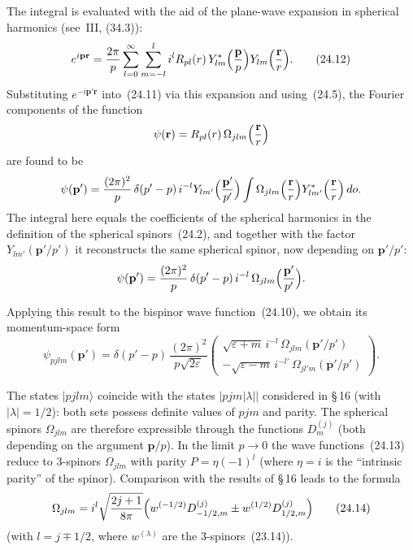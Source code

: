 The integral is evaluated with the aid of the plane-wave expansion in spherical harmonics (see~III, (34.3)):
\begin{equation}
e^{i\mathbf{p}\mathbf{r}} = \frac{2\pi}{p}\sum_{l=0}^{\infty}\sum_{m=-l}^{l}i^l R_{pl}(r)\,Y^*_{lm}\Bigl(\frac{\mathbf{p}}{p}\Bigr)Y_{lm}\Bigl(\frac{\mathbf{r}}{r}\Bigr).
\tag{24.12}
\end{equation}
Substituting $e^{-i\mathbf{p}'\mathbf{r}}$ into~(24.11) via this expansion and using~(24.5), the Fourier components of the function
\[
\psi(\mathbf{r}) = R_{pl}(r)\,\Omega_{jlm}\Bigl(\frac{\mathbf{r}}{r}\Bigr)
\]
are found to be
\[
\psi(\mathbf{p}') = \frac{(2\pi)^2}{p}\,\delta(p' - p)\,i^{-l}Y_{lm'}\Bigl(\frac{\mathbf{p}'}{p'}\Bigr)\int \Omega_{jlm}\Bigl(\frac{\mathbf{r}}{r}\Bigr)Y^*_{lm'}\Bigl(\frac{\mathbf{r}}{r}\Bigr)\,do.
\]
The integral here equals the coefficients of the spherical harmonics in the definition of the spherical spinors~(24.2), and together with the factor $Y_{lm'}(\mathbf{p}'/p')$ it reconstructs the same spherical spinor, now depending on $\mathbf{p}'/p'$:
\[
\psi(\mathbf{p}') = \frac{(2\pi)^2}{p}\,\delta(p' - p)\,i^{-l}\,\Omega_{jlm}\Bigl(\frac{\mathbf{p}'}{p'}\Bigr).
\]

Applying this result to the bispinor wave function~(24.10), we obtain its momentum-space form
\begin{equation}
\psi_{pjlm}(\mathbf{p}') = \delta(p' - p)\,\frac{(2\pi)^2}{p\sqrt{2\varepsilon}}\begin{pmatrix} \sqrt{\varepsilon + m}\,i^{-l}\,\Omega_{jlm}(\mathbf{p}'/p')\\ -\sqrt{\varepsilon - m}\,i^{-l'}\,\Omega_{jl'm}(\mathbf{p}'/p') \end{pmatrix}.
\tag{24.13}
\end{equation}

The states $|pjlm\rangle$ coincide with the states $|pjm|\lambda||$ considered in \S\,16 (with $|\lambda| = 1/2$): both sets possess definite values of $pjm$ and parity. The spherical spinors $\Omega_{jlm}$ are therefore expressible through the functions $D^{(j)}_m$ (both depending on the argument $\mathbf{p}/p$). In the limit $p \to 0$ the wave functions~(24.13) reduce to 3-spinors $\Omega_{jlm}$ with parity $P = \eta(-1)^l$ (where $\eta = i$ is the ``intrinsic parity'' of the spinor). Comparison with the results of \S\,16 leads to the formula
\begin{equation}
\Omega_{jlm} = i^l\sqrt{\frac{2j+1}{8\pi}}\Bigl(w^{(-1/2)}D^{(j)}_{-1/2,m} \pm w^{(1/2)}D^{(j)}_{1/2,m}\Bigr)
\tag{24.14}
\end{equation}
(with $l = j \mp 1/2$, where $w^{(\lambda)}$ are the 3-spinors~(23.14)).
